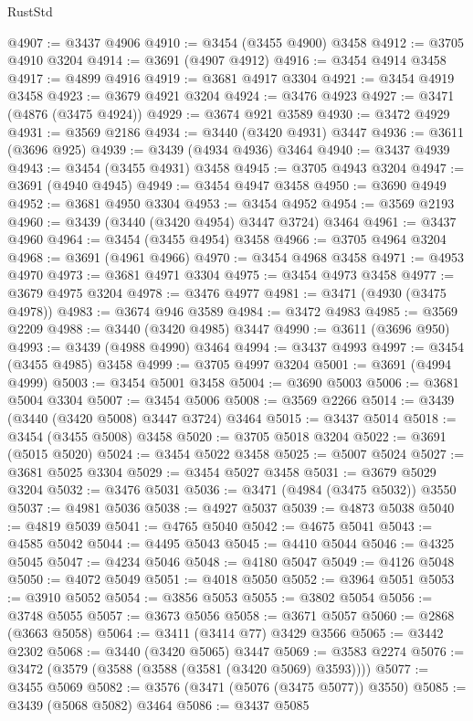 \begin{lexlean}{RustStd}
\begin{coremodule}
{{{{{{{{{{{{{{{{{{{@4907 := @3437 @4906
@4910 := @3454 (@3455 @4900) @3458
@4912 := @3705 @4910 @3204
@4914 := @3691 (@4907 @4912)
@4916 := @3454 @4914 @3458
@4917 := @4899 @4916
@4919 := @3681 @4917 @3304
@4921 := @3454 @4919 @3458
@4923 := @3679 @4921 @3204
@4924 := @3476 @4923
@4927 := @3471 (@4876 (@3475 @4924))
@4929 := @3674 @921 @3589
@4930 := @3472 @4929
@4931 := @3569 @2186
@4934 := @3440 (@3420 @4931) @3447
@4936 := @3611 (@3696 @925)
@4939 := @3439 (@4934 @4936) @3464
@4940 := @3437 @4939
@4943 := @3454 (@3455 @4931) @3458
@4945 := @3705 @4943 @3204
@4947 := @3691 (@4940 @4945)
@4949 := @3454 @4947 @3458
@4950 := @3690 @4949
@4952 := @3681 @4950 @3304
@4953 := @3454 @4952
@4954 := @3569 @2193
@4960 := @3439 (@3440 (@3420 @4954) @3447 @3724) @3464
@4961 := @3437 @4960
@4964 := @3454 (@3455 @4954) @3458
@4966 := @3705 @4964 @3204
@4968 := @3691 (@4961 @4966)
@4970 := @3454 @4968 @3458
@4971 := @4953 @4970
@4973 := @3681 @4971 @3304
@4975 := @3454 @4973 @3458
@4977 := @3679 @4975 @3204
@4978 := @3476 @4977
@4981 := @3471 (@4930 (@3475 @4978))
@4983 := @3674 @946 @3589
@4984 := @3472 @4983
@4985 := @3569 @2209
@4988 := @3440 (@3420 @4985) @3447
@4990 := @3611 (@3696 @950)
@4993 := @3439 (@4988 @4990) @3464
@4994 := @3437 @4993
@4997 := @3454 (@3455 @4985) @3458
@4999 := @3705 @4997 @3204
@5001 := @3691 (@4994 @4999)
@5003 := @3454 @5001 @3458
@5004 := @3690 @5003
@5006 := @3681 @5004 @3304
@5007 := @3454 @5006
@5008 := @3569 @2266
@5014 := @3439 (@3440 (@3420 @5008) @3447 @3724) @3464
@5015 := @3437 @5014
@5018 := @3454 (@3455 @5008) @3458
@5020 := @3705 @5018 @3204
@5022 := @3691 (@5015 @5020)
@5024 := @3454 @5022 @3458
@5025 := @5007 @5024
@5027 := @3681 @5025 @3304
@5029 := @3454 @5027 @3458
@5031 := @3679 @5029 @3204
@5032 := @3476 @5031
@5036 := @3471 (@4984 (@3475 @5032)) @3550
@5037 := @4981 @5036
@5038 := @4927 @5037
@5039 := @4873 @5038
@5040 := @4819 @5039
@5041 := @4765 @5040
@5042 := @4675 @5041
@5043 := @4585 @5042
@5044 := @4495 @5043
@5045 := @4410 @5044
@5046 := @4325 @5045
@5047 := @4234 @5046
@5048 := @4180 @5047
@5049 := @4126 @5048
@5050 := @4072 @5049
@5051 := @4018 @5050
@5052 := @3964 @5051
@5053 := @3910 @5052
@5054 := @3856 @5053
@5055 := @3802 @5054
@5056 := @3748 @5055
@5057 := @3673 @5056
@5058 := @3671 @5057
@5060 := @2868 (@3663 @5058)
@5064 := @3411 (@3414 @77) @3429 @3566
@5065 := @3442 @2302
@5068 := @3440 (@3420 @5065) @3447
@5069 := @3583 @2274
@5076 := @3472 (@3579 (@3588 (@3588 (@3581 (@3420 @5069) @3593))))
@5077 := @3455 @5069
@5082 := @3576 (@3471 (@5076 (@3475 @5077)) @3550)
@5085 := @3439 (@5068 @5082) @3464
@5086 := @3437 @5085
}}}}}}}}}}}}}}}}}}}
\end{coremodule}
\end{lexlean}

